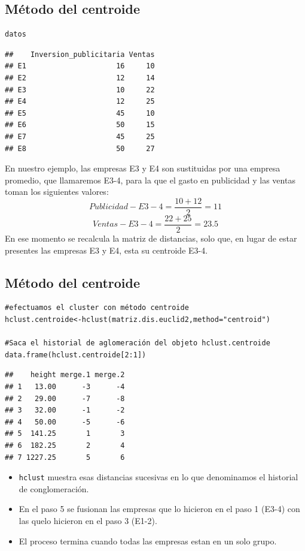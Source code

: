 \documentclass[]{article}
\providecommand{\tightlist}{%
  \setlength{\itemsep}{0pt}\setlength{\parskip}{0pt}}
\begin{document}
\subsection{Método del centroide}\label{muxe9todo-del-centroide-2}

\hypertarget{left}{}
\begin{verbatim}
datos
\end{verbatim}

\begin{verbatim}
##    Inversion_publicitaria Ventas
## E1                     16     10
## E2                     12     14
## E3                     10     22
## E4                     12     25
## E5                     45     10
## E6                     50     15
## E7                     45     25
## E8                     50     27
\end{verbatim}

\hypertarget{right}{}
En nuestro ejemplo, las empresas E3 y E4 son sustituidas por una empresa
promedio, que llamaremos E3-4, para la que el gasto en publicidad y las
ventas toman los siguientes valores:
\[Publicidad-E3-4=\frac{10+12}{2}=11\]
\[Ventas-E3-4=\frac{22+25}{2}=23.5\] En ese momento se recalcula la
matriz de distancias, solo que, en lugar de estar presentes las empresas
E3 y E4, esta su centroide E3-4.

\subsection{Método del centroide}\label{muxe9todo-del-centroide-3}

\hypertarget{left}{}
\begin{verbatim}
#efectuamos el cluster con método centroide
hclust.centroide<-hclust(matriz.dis.euclid2,method="centroid")

#Saca el historial de aglomeración del objeto hclust.centroide
data.frame(hclust.centroide[2:1])
\end{verbatim}

\begin{verbatim}
##    height merge.1 merge.2
## 1   13.00      -3      -4
## 2   29.00      -7      -8
## 3   32.00      -1      -2
## 4   50.00      -5      -6
## 5  141.25       1       3
## 6  182.25       2       4
## 7 1227.25       5       6
\end{verbatim}

\hypertarget{right}{}
\begin{itemize}
\tightlist
\item
  \texttt{hclust} muestra esas distancias sucesivas en lo que
  denominamos el historial de conglomeración.
\item
  En el paso 5 se fusionan las empresas que lo hicieron en el paso 1
  (E3-4) con las quelo hicieron en el paso 3 (E1-2).
\item
  El proceso termina cuando todas las empresas estan en un solo grupo.
\end{itemize}
\end{document}
